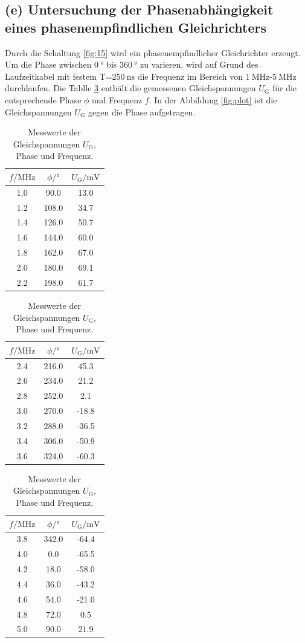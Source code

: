 \subsection{(e) Untersuchung der Phasenabhängigkeit eines
phasenempfindlichen Gleichrichters}
\label{subsec:auswertung_e}
Durch die Schaltung \ref{fig:15} wird ein phasenempfindlicher
Gleichrichter erzeugt. Um die Phase \phi zwischen
$\SI{0}{\degree}$ bis $\SI{360}{\degree}$ zu varieren, wird
auf Grund des Laufzeitkabel mit festem T=$\SI{250}{\nano\second}$
die Frequenz im Bereich von $\SI{1}{\mega\hertz}$-$\SI{5}{\mega\hertz}$
durchlaufen. Die Tablle \ref{tab:messwerte} enthält die gemessenen
Gleichspannungen $U_{\text{G}}$ für die entsprechende Phase $\phi$ und Frequenz $f$.
In der Abbildung \ref{fig:plot} ist die Gleichspannungen $U_{\text{G}}$
gegen die Phase aufgetragen.
\begin{table}
  \centering
  \caption{Messwerte der Gleichspannungen $U_{\text{G}}$, Phase \phi und Frequenz.}
  \label{tab:messwerte}
\begin{tabular}{c c c|}
\toprule
$f/\si{\mega\hertz}$ & $\phi / \si{\degree}$ &$ U_{\text{G}}/ \si{\milli\volt}$ \\
  \midrule
   1.0	&	90.0	&	13.0   \\
   1.2	&	108.0	&	34.7   \\
   1.4	&	126.0	&	50.7   \\
   1.6	&	144.0	&	60.0   \\
   1.8	&	162.0	&	67.0   \\
   2.0	&	180.0	&	69.1   \\
   2.2	&	198.0	&	61.7   \\
\bottomrule
\end{tabular}
\begin{tabular}{|c c c|}
  \toprule
  $f/\si{\mega\hertz}$ & $\phi / \si{\degree}$ &$ U_{\text{G}}/ \si{\milli\volt}$ \\
    \midrule
   2.4	&	216.0	&	45.3   \\
   2.6	&	234.0	&	21.2   \\
   2.8	&	252.0	&	2.1   \\
   3.0	&	270.0	&	-18.8   \\
   3.2	&	288.0	&	-36.5   \\
   3.4	&	306.0	&	-50.9   \\
   3.6	&	324.0	&	-60.3   \\
   \bottomrule
   \end{tabular}
  \begin{tabular}{|c c c}
    \toprule
    $f/\si{\mega\hertz}$ & $\phi / \si{\degree}$& $ U_{\text{G}}/ \si{\milli\volt}$ \\
      \midrule
   3.8	&	342.0	&	-64.4   \\
   4.0	&	0.0	&	-65.5   \\
   4.2	&	18.0	&	-58.0   \\
   4.4	&	36.0	&	-43.2   \\
   4.6	&	54.0	&	-21.0   \\
   4.8	&	72.0	&	0.5   \\
   5.0	&	90.0	&	21.9   \\
\bottomrule
\end{tabular}
\end{table}


